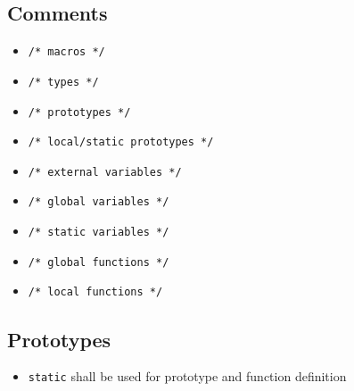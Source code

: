 \subsection{Comments}
	\begin{itemize}
		\item \lstinline{/* macros */}
		\item \lstinline{/* types */}
		\item \lstinline{/* prototypes */}
		\item \lstinline{/* local/static prototypes */}
		\item \lstinline{/* external variables */}
		\item \lstinline{/* global variables */}
		\item \lstinline{/* static variables */}
		\item \lstinline{/* global functions */}
		\item \lstinline{/* local functions */}
	\end{itemize}
	
\subsection{Prototypes}
	\begin{itemize}
		\item \lstinline{static} shall be used for prototype and function definition
	\end{itemize}
